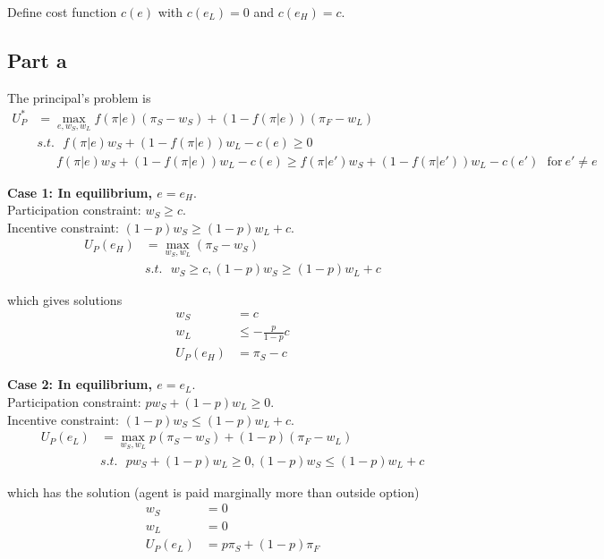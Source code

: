 Define cost function $c(e)$ with $c(e_L) = 0$ and $c(e_H) = c$.

\subsection*{Part a}
The principal's problem is
\begin{align*}
    U_P^* &= \max_{e, w_S, w_L} f(\pi| e)(\pi_S- w_S) + (1-f(\pi| e))(\pi_F- w_L)\\
    & s.t. ~~~  f(\pi| e)w_S + (1-f(\pi| e))w_L - c(e) \ge 0\\
    &~~~~~~~   f(\pi| e)w_S + (1-f(\pi| e))w_L  - c(e)\ge f(\pi| e')w_S + (1-f(\pi| e'))w_L - c(e') ~~~\text{for}~e' \neq e
\end{align*}

\textbf{Case 1: In equilibrium, $e= e_H$}.\\
Participation constraint: $w_S \ge c$.\\
Incentive constraint: $(1-p)w_S \ge (1-p)w_L + c$.\\

\begin{align*}
    U_P(e_H) &= \max_{w_S, w_L} (\pi_S- w_S) \\
    & s.t. ~~~  w_S \ge c, (1-p)w_S \ge (1-p)w_L + c
\end{align*}

which gives solutions
\begin{align*}
    w_S &= c\\
    w_L &\le -\frac{p}{1-p} c\\
    U_P(e_H) &= \pi_S - c
\end{align*}

\textbf{Case 2: In equilibrium, $e= e_L$}.\\
Participation constraint: $p w_S + (1-p)w_L \ge 0$.\\
Incentive constraint: $(1-p)w_S \le (1-p)w_L + c$.\\

\begin{align*}
    U_P(e_L) &= \max_{w_S, w_L} p(\pi_S- w_S) + (1-p)(\pi_F- w_L) \\
    & s.t. ~~~  p w_S + (1-p)w_L \ge 0, (1-p)w_S \le (1-p)w_L + c
\end{align*}

which has the solution (agent is paid marginally more than outside option)
\begin{align*}
    w_S &= 0\\
    w_L &= 0\\
    U_P(e_L) &= p \pi_S + (1-p)\pi_F
\end{align*}

